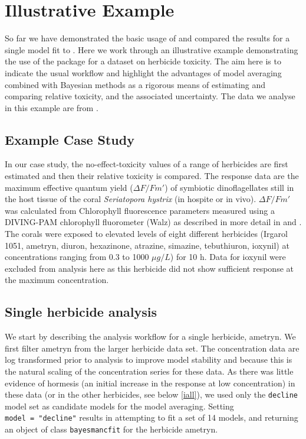 \documentclass[
  shortnames]{jss}
\begin{document}
\section[Illustrative Example]{Illustrative Example}\label{iexample}

So far we have demonstrated the basic usage of  and compared the results for a single model fit to . Here we work through an illustrative example demonstrating the use of the package for a dataset on herbicide toxicity. The aim here is to indicate the usual workflow and highlight the advantages of model averaging combined with Bayesian methods as a rigorous means of estimating and comparing relative toxicity, and the associated uncertainty. The data we analyse in this example are from \citet{jones2003meps}.

\hypertarget{example-case-study}{%
\subsection{Example Case Study}\label{example-case-study}}

In our case study, the no-effect-toxicity values of a range of herbicides are first estimated and then their relative toxicity is compared. The response data are the maximum effective quantum yield (\({\Delta F / Fm'}\)) of symbiotic dinoflagellates still in the host tissue of the coral \emph{Seriatopora hystrix} (in hospite or in vivo). \({\Delta F / Fm'}\) was calculated from Chlorophyll fluorescence parameters measured using a DIVING-PAM chlorophyll fluorometer (Walz) as described in more detail in \citet{jones2003meps} and \citet{jones2003effects}. The corals were exposed to elevated levels of eight different herbicides (Irgarol 1051, ametryn, diuron, hexazinone, atrazine, simazine, tebuthiuron, ioxynil) at concentrations ranging from 0.3 to 1000 \({\mu g/L}\)) for 10 h. Data for ioxynil were excluded from analysis here as this herbicide did not show sufficient response at the maximum concentration.

\subsection[Single herbicide]{Single herbicide analysis}\label{isingle}

We start by describing the analysis workflow for a single herbicide, ametryn. We first filter ametryn from the larger herbicide data set. The concentration data are log transformed prior to analysis to improve model stability and because this is the natural scaling of the concentration series for these data. As there was little evidence of hormesis (an initial increase in the response at low concentration) in these data (or in the other herbicides, see below \ref{iall}), we used only the \texttt{decline} model set as candidate models for the model averaging. Setting \texttt{model\ =\ "decline"} results in  attempting to fit a set of 14 models, and returning an object of class \texttt{bayesmancfit} for the herbicide ametryn.
\end{document}
